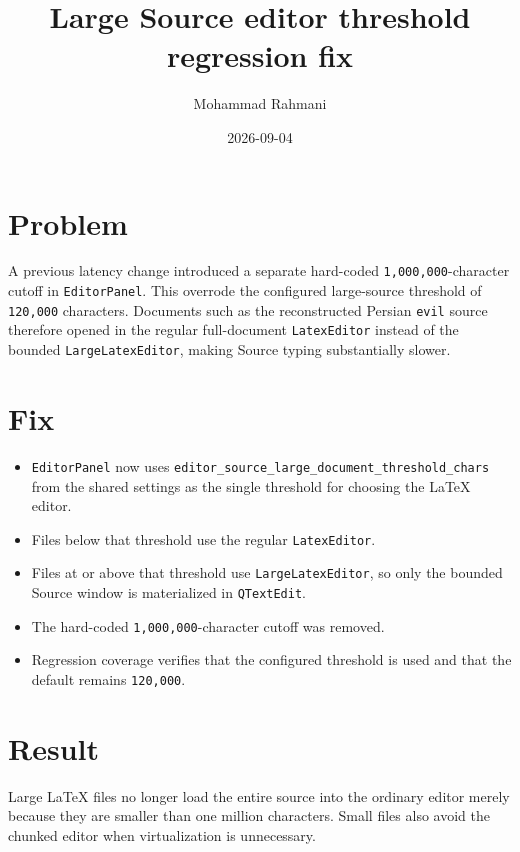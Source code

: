 \documentclass[a4paper]{article}
\title{Large Source editor threshold regression fix}
\date{2026-09-04}
\author{Mohammad Rahmani}
\begin{document}
   \maketitle

   \section{Problem}

   A previous latency change introduced a separate hard-coded
   \texttt{1,000,000}-character cutoff in \texttt{EditorPanel}. This overrode
   the configured large-source threshold of \texttt{120,000} characters.
   Documents such as the reconstructed Persian \texttt{evil} source therefore
   opened in the regular full-document \texttt{LatexEditor} instead of the
   bounded \texttt{LargeLatexEditor}, making Source typing substantially slower.

   \section{Fix}

   \begin{itemize}
      \item \texttt{EditorPanel} now uses
      \texttt{editor\_source\_large\_document\_threshold\_chars} from the shared
      settings as the single threshold for choosing the LaTeX editor.
      \item Files below that threshold use the regular \texttt{LatexEditor}.
      \item Files at or above that threshold use \texttt{LargeLatexEditor}, so
      only the bounded Source window is materialized in \texttt{QTextEdit}.
      \item The hard-coded \texttt{1,000,000}-character cutoff was removed.
      \item Regression coverage verifies that the configured threshold is used
      and that the default remains \texttt{120,000}.
   \end{itemize}

   \section{Result}

   Large LaTeX files no longer load the entire source into the ordinary editor
   merely because they are smaller than one million characters. Small files
   also avoid the chunked editor when virtualization is unnecessary.

   
   
\end{document}
